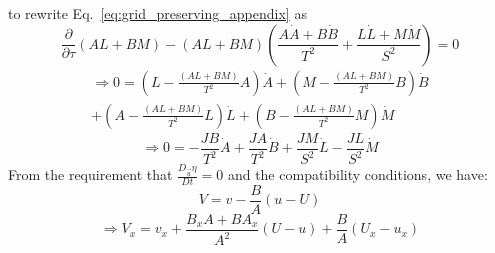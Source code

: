 \documentclass[12pt,letterpaper]{article}
\begin{document}
to rewrite Eq.~\ref{eq:grid_preserving_appendix} as 
\begin{equation}
\frac{\partial}{\partial \tau}\left(AL+BM\right)-\left(AL+BM\right)
\left(\frac{A\dot{A}+B\dot{B}}{T^2}+\frac{L\dot{L}+M\dot{M}}{S^2}\right)=0
\end{equation}
\begin{equation}
\begin{split}
\Rightarrow
0=\left(L-\frac{\left(AL+BM\right)}{T^2}A\right)\dot{A}+
\left(M-\frac{\left(AL+BM\right)}{T^2}B\right)\dot{B}\\[.5em]+
\left(A-\frac{\left(AL+BM\right)}{T^2}L\right)\dot{L}+
\left(B-\frac{\left(AL+BM\right)}{T^2}M\right)\dot{M}
\end{split}
\end{equation}
\begin{equation}
\Rightarrow 0=-\frac{JB}{T^2}\dot{A}+\frac{JA}{T^2}\dot{B}+\frac{JM}
{S^2}\dot{L}-\frac{JL}{S^2}\dot{M}
\end{equation}
From the requirement that $\frac{D_{\vec{u}}\eta}{Dt}=0$ and the
compatibility conditions, we have:
\begin{equation}
V=v-\frac{B}{A}\left(u-U\right)
\end{equation}
\begin{equation}\Rightarrow
V_x=v_x+\frac{B_x A+B A_x}{A^2}\left(U-u\right)+\frac{B}{A}\left(U_x-u_x\right)
\end{equation}
\end{document}
